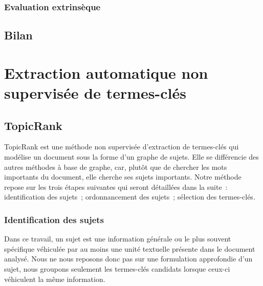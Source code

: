       \subsubsection{Evaluation extrinsèque}
      \label{subsubsec:main-automatic_keyphrase_annotation-keyphrase_candidate_selection-evaluation-extrinsic_evaluation}

    \subsection{Bilan}
    \label{subsec:main-automatic_keyphrase_annotation-keyphrase_candidate_selection-conclusion}


  \section{Extraction automatique non supervisée de termes-clés}
  \label{sec:main-automatic_keyphrase_annotation-unsupervised_automatic_keyphrase_extraction}

    \subsection{TopicRank}
    \label{subsec:main-automatic_keyphrase_annotation-unsupervised_automatic_keyphrase_extraction-topicrank}
      TopicRank est une méthode non supervisée d'extraction de termes-clés qui
      modélise un document sous la forme d'un graphe de sujets.
      Elle se différencie des autres méthodes à base de graphe, car, plutôt que
      de chercher les mots importants du document, elle cherche ses sujets
      importants.
      Notre méthode repose sur les trois étapes suivantes qui seront détaillées
      dans la suite~: identification des sujets~; ordonnancement des sujets~;
      sélection des termes-clés.

      \subsubsection{Identification des sujets}
      \label{subsubsec:main-automatic_keyphrase_annotation-unsupervised_automatic_keyphrase_extraction-topicrank-topic_identification}
        Dans ce travail, un sujet est une information générale ou le plus
        souvent spécifique véhiculée par au moins une unité textuelle présente
        dans le document analysé. Nous ne nous reposons donc pas sur une
        formulation approfondie d'un sujet, nous groupons seulement les
        termes-clés candidats lorsque ceux-ci véhiculent la même information.

